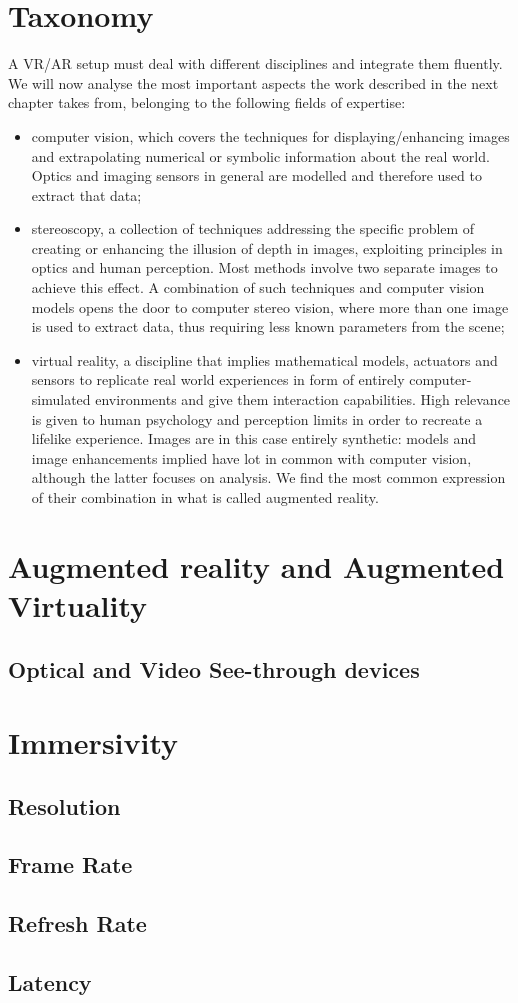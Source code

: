 \section{Taxonomy}

A VR/AR setup must deal with different disciplines and integrate them fluently. We will now analyse the most important aspects the work described in the next chapter takes from, belonging to the following fields of expertise:
\begin{itemize}
\item
computer vision, which covers the techniques for displaying/enhancing images and extrapolating numerical or symbolic information about the real world. Optics and imaging sensors in general are modelled and therefore used to extract that data;
\item
stereoscopy, a collection of techniques addressing the specific problem of creating or enhancing the illusion of depth in images, exploiting principles in optics and human perception. Most methods involve two separate images to achieve this effect. A combination of such techniques and computer vision models opens the door to computer stereo vision, where more than one image is used to extract data, thus requiring less known parameters from the scene;
\item
virtual reality, a discipline that implies mathematical models, actuators and sensors to replicate real world experiences in form of entirely computer-simulated environments and give them interaction capabilities. High relevance is given to human psychology and perception limits in order to recreate a lifelike experience. Images are in this case entirely synthetic: models and image enhancements implied have lot in common with computer vision, although the latter focuses on analysis. We find the most common expression of their combination in what is called augmented reality.
\end{itemize}

\section{Augmented reality and Augmented Virtuality}

\subsection{Optical and Video See-through devices} %

\section{Immersivity}

\subsection{Resolution}
\subsection{Frame Rate}
\subsection{Refresh Rate}
\subsection{Latency}

